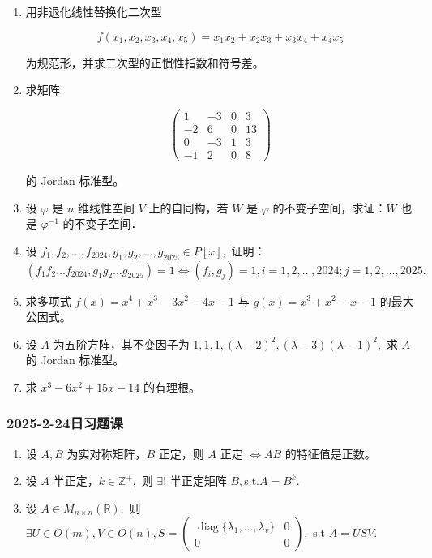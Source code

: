 \begin{enumerate}
    \item 用非退化线性替换化二次型

    $$
    f(x_{1},x_{2},x_{3},x_{4},x_{5})=x_{1}x_{2}+x_{2}x_{3}+x_{3}x_{4}+x_{4}x_{5}
    $$
    
    为规范形，并求二次型的正惯性指数和符号差。
    \item 求矩阵

    $$
    \begin{pmatrix}
    1 &-3 &0  & 3 \\
    -2 & 6 & 0 & 13 \\
    0 & -3 & 1 & 3 \\
    -1 & 2 & 0 & 8
    \end{pmatrix}
    $$
    
    的 Jordan 标准型。
    \item 设 $\varphi$ 是 $n$ 维线性空间 $V$ 上的自同构，若 $W$ 是 $\varphi$ 的不变子空间，求证：$W$ 也是 $\varphi^{-1}$ 的不变子空间．
    \item 设 $f_{1},f_{2},\dots,f_{2024},g_{1},g_{2},\dots,g_{2025} \in P[x],$ 证明：$(f_{1}f_{2}\dots f_{2024},g_{1}g_{2}\dots g_{2025})=1 \Leftrightarrow (f_{i},g_{j})=1,i=1,2,\dots,2024;j=1,2,\dots,2025.$
    \item 求多项式 $f(x)=x^{4}+x^{3}-3x^{2}-4x-1$ 与 $g(x)=x^{3}+x^{2}-x-1$ 的最大公因式。
    \item 设 $A$ 为五阶方阵，其不变因子为 $1,1,1,(\lambda-2)^{2},(\lambda-3)(\lambda-1)^{2},$ 求 $A$ 的 Jordan 标准型。
    \item 求 $x^{3}-6x^{2}+15x-14$ 的有理根。
\end{enumerate}

\subsubsection{2025-2-24日习题课}

\begin{enumerate}
    \item 设 $A,B$ 为实对称矩阵，$B$ 正定，则 $A$ 正定 $\Leftrightarrow AB$ 的特征值是正数。
    \item 设 $A$ 半正定，$k \in \mathbb{Z}^{+},$ 则 $\exists !$ 半正定矩阵 $B,$s.t.$A=B^{k}.$
    \item 设 $A \in M_{n \times n}(\mathbb{R}),$ 则 ${} \exists U \in O(m),V \in O(n),S=\begin{pmatrix}\operatorname{diag}\{\lambda_{1},\dots,\lambda_{v}\} & 0 \\ 0 & 0\end{pmatrix}, {}$ s.t $A=USV.$
\end{enumerate}

